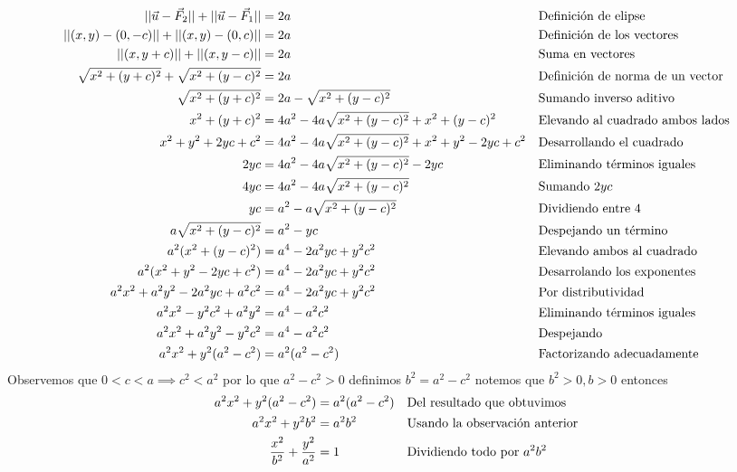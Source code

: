 \documentclass[letterpaper]{article}
\renewcommand{\*}{\cdot}
\theoremstyle{definition}
\begin{document}
\begin{align*}
	|| \vec{u} - \vec{F}_2 || + || \vec{u} - \vec{F}_1 || &= 2a && \text{Definición de elipse}\\
	|| (x,y) - (0,-c) || + || (x,y) - (0,c) || &= 2a && \text{Definición de los vectores}\\
	|| (x,y + c)|| + || (x,y -c)|| &= 2a && \text{Suma en vectores}\\
	 \sqrt{x^2 + (y+c)^2} + \sqrt{x^2 + (y-c)^2} &= 2a && \text{Definición de norma de un vector}\\
	 \sqrt{x^2 + (y+c)^2} &= 2a - \sqrt{x^2 + (y-c)^2}  && \text{Sumando inverso aditivo}\\
	 x^2 + (y+c)^2 &= 4a^2 -4a\sqrt{x^2 + (y-c)^2} + x^2 + (y-c)^2 && \text{Elevando al cuadrado ambos lados}\\
	 x^2 + y^2 + 2yc +c^2 &= 4a^2 -4a\sqrt{x^2 + (y-c)^2} + x^2 + y^2 -2yc +c^2 && \text{Desarrollando el cuadrado}\\
	 2yc &= 4a^2 -4a\sqrt{x^2 + (y-c)^2} -2yc && \text{Eliminando términos iguales}\\
	 4yc &= 4a^2 -4a\sqrt{x^2 + (y-c)^2} && \text{Sumando $  2yc $}\\
	 yc &= a^2 -a\sqrt{x^2 + (y-c)^2} && \text{Dividiendo entre 4}\\
	 a\sqrt{x^2 + (y-c)^2} &= a^2 - yc && \text{Despejando un término}\\
	 a^2(x^2 + (y-c)^2) &= a^4 - 2a^2yc + y^2c^2 && \text{Elevando ambos al cuadrado}\\
	 a^2(x^2 + y^2 - 2yc +c^2) &= a^4 - 2a^2yc + y^2c^2 && \text{Desarrolando los exponentes}\\
	 a^2x^2 + a^2y^2 - 2a^2yc +a^2c^2 &= a^4 - 2a^2yc + y^2c^2 && \text{Por distributividad}\\
	 a^2x^2  - y^2c^2+ a^2y^2 &= a^4 - a^2c^2 && \text{Eliminando términos iguales}\\
	 a^2x^2 + a^2y^2 - y^2c^2 &= a^4 - a^2c^2 && \text{Despejando }\\
	 a^2x^2 + y^2(a^2 - c^2) &= a^2(a^2 - c^2) && \text{Factorizando adecuadamente}\\
\end{align*}
Observemos que $ 0<c<a \implies c^2 < a^2 $ por lo que $ a^2 - c^2 > 0 $ definimos $ b^2 = a^2 - c^2 $ notemos que $ b^2 > 0, b>0 $ entonces 
\begin{align*}
	 a^2x^2 + y^2(a^2 - c^2) &= a^2(a^2 - c^2) && \text{Del resultado que obtuvimos}\\
	 a^2x^2 + y^2b^2 &= a^2b^2 && \text{Usando la observación anterior}\\
	 \dfrac{x^2}{b^2} + \dfrac{y^2}{a^2} &= 1 && \text{Dividiendo todo por $ a^2b^2 $}\\
\end{align*}
\end{document}
